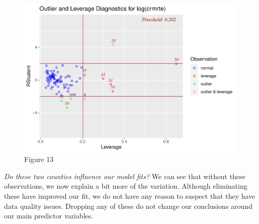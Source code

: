 \documentclass[]{article}
\begin{document}
\begin{figure}

{\centering \includegraphics{lab_3_final_files/figure-latex/unnamed-chunk-40-1} 

}

\caption{Figure 13}\label{fig:unnamed-chunk-40}
\end{figure}

\emph{Do these two counties influence our model fits?} We can see that
without these observations, we now explain a bit more of the variation.
Although eliminating these have improved our fit, we do not have any
reason to suspect that they have data quality issues. Dropping any of
these do not change our conclusions around our main predictor variables.
\end{document}
